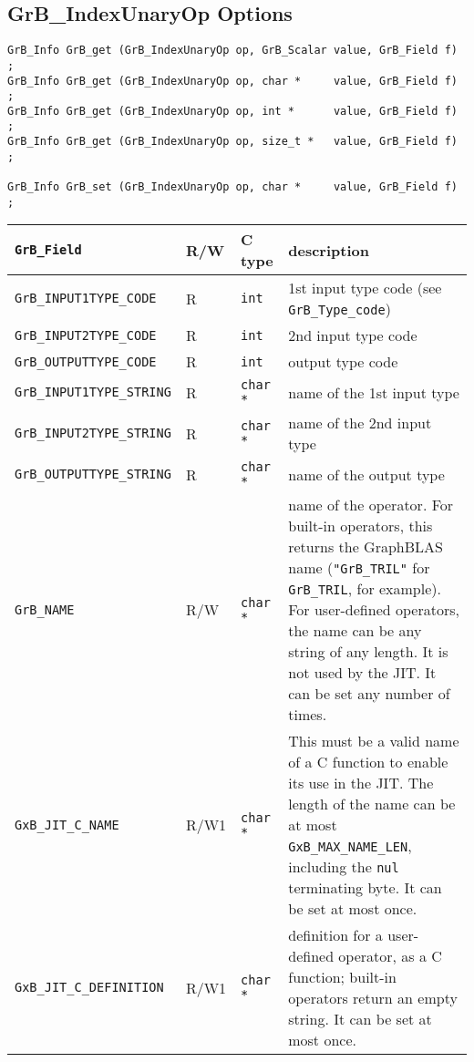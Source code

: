 \newpage
\subsection{{\sf GrB\_IndexUnaryOp} Options}
\label{get_set_idxunop}

\begin{mdframed}[userdefinedwidth=6in]
{\footnotesize
\begin{verbatim}
GrB_Info GrB_get (GrB_IndexUnaryOp op, GrB_Scalar value, GrB_Field f) ;
GrB_Info GrB_get (GrB_IndexUnaryOp op, char *     value, GrB_Field f) ;
GrB_Info GrB_get (GrB_IndexUnaryOp op, int *      value, GrB_Field f) ;
GrB_Info GrB_get (GrB_IndexUnaryOp op, size_t *   value, GrB_Field f) ;

GrB_Info GrB_set (GrB_IndexUnaryOp op, char *     value, GrB_Field f) ;
\end{verbatim}
}\end{mdframed}

\noindent
{\small
\begin{tabular}{|l|l|l|p{2.8in}|}
\hline
\verb'GrB_Field'                    & R/W  & C type        & description \\
\hline
\verb'GrB_INPUT1TYPE_CODE'          & R    & \verb'int'    & 1st input type code (see \verb'GrB_Type_code') \\
\verb'GrB_INPUT2TYPE_CODE'          & R    & \verb'int'    & 2nd input type code \\
\verb'GrB_OUTPUTTYPE_CODE'          & R    & \verb'int'    & output type code \\
\verb'GrB_INPUT1TYPE_STRING'        & R    & \verb'char *' & name of the 1st input type \\
\verb'GrB_INPUT2TYPE_STRING'        & R    & \verb'char *' & name of the 2nd input type \\
\verb'GrB_OUTPUTTYPE_STRING'        & R    & \verb'char *' & name of the output type \\
\hline
\verb'GrB_NAME'                     & R/W  & \verb'char *' &
    name of the operator.  For built-in operators, this returns the GraphBLAS
    name (\verb'"GrB_TRIL"' for \verb'GrB_TRIL', for example).
    For user-defined operators, the name can be any string of any length.  It
    is not used by the JIT.  It can be set any number of times. \\
\verb'GxB_JIT_C_NAME'               & R/W1 & \verb'char *' &
    This must be a valid name of a C function to enable its use in the JIT.
    The length of the name can be at most \verb'GxB_MAX_NAME_LEN', including
    the \verb'nul' terminating byte.  It can be set at most once. \\
\verb'GxB_JIT_C_DEFINITION'         & R/W1 & \verb'char *' &
    definition for a user-defined operator, as a C function; built-in operators
    return an empty string.  It can be set at most once. \\
\hline
\end{tabular}
}

